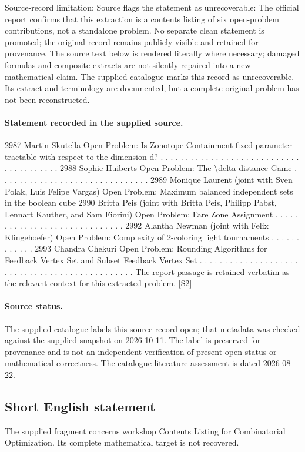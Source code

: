 \documentclass[11pt]{article}
\begin{document}
Source-record limitation: Source flags the statement as unrecoverable: The official report confirms that this extraction is a contents listing of six open-problem contributions, not a standalone problem. No separate clean statement is promoted; the original record remains publicly visible and retained for provenance.
The source text below is rendered literally where necessary; damaged formulas and composite extracts are not silently repaired into a new mathematical claim.
The supplied catalogue marks this record as unrecoverable. Its extract and terminology are documented, but a complete original problem has not been reconstructed.
\paragraph{Statement recorded in the supplied source.}
2987 Martin Skutella Open Problem: Is Zonotope Containment fixed-parameter tractable with respect to the dimension d? . . . . . . . . . . . . . . . . . . . . . . . . . . . . . . . . . . . . . . . 2988 Sophie Huiberts Open Problem: The \textbackslash{}delta-distance Game . . . . . . . . . . . . . . . . . . . . . . . . . . . . . . 2989 Monique Laurent (joint with Sven Polak, Luis Felipe Vargas) Open Problem: Maximum balanced independent sets in the boolean cube 2990 Britta Peis (joint with Britta Peis, Philipp Pabst, Lennart Kauther, and Sam Fiorini) Open Problem: Fare Zone Assignment . . . . . . . . . . . . . . . . . . . . . . . . . . . . . 2992 Alantha Newman (joint with Felix Klingehoefer) Open Problem: Complexity of 2-coloring light tournaments . . . . . . . . . . . . 2993 Chandra Chekuri Open Problem: Rounding Algorithms for Feedback Vertex Set and Subset Feedback Vertex Set . . . . . . . . . . . . . . . . . . . . . . . . . . . . . . . . . . . . . . . . . . . . . . The report passage is retained verbatim as the relevant context for this extracted problem. \href{https://doi.org/10.4171/owr/2024/50}{[S2]}
\paragraph{Source status.}
The supplied catalogue labels this source record open; that metadata was checked against the supplied snapshot on 2026-10-11. The label is preserved for provenance and is not an independent verification of present open status or mathematical correctness. The catalogue literature assessment is dated 2026-08-22.
\subsection{Short English statement}
The supplied fragment concerns workshop Contents Listing for Combinatorial Optimization. Its complete mathematical target is not recovered.
\end{document}
